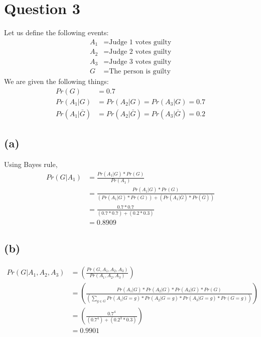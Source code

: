 \documentclass[11pt]{article}
\begin{document}
\section*{Question 3}
Let us define the following events:
\begin{equation*}
\begin{split}
A_1 &= \text{Judge 1 votes guilty}\\
A_2 &= \text{Judge 2 votes guilty}\\
A_3 &= \text{Judge 3 votes guilty}\\
G &= \text{The person is guilty}
\end{split}
\end{equation*}
We are given the following things:
\begin{equation*}
\begin{split}
Pr(G) &= 0.7\\
Pr(A_1|G) &= Pr(A_2|G) = Pr(A_3|G) = 0.7\\
Pr(A_1|\bar{G}) &= Pr(A_2|\bar{G}) = Pr(A_3|\bar{G}) = 0.2
\end{split}
\end{equation*}
\subsection*{(a)}
Using Bayes rule,
\begin{equation*}
\begin{split}
Pr(G|A_1) &= \frac{Pr(A_1|G)*Pr(G)}{Pr(A_1)}\\
&=\frac{Pr(A_1|G)*Pr(G)}{\left(Pr(A_1|G)*Pr(G)\right) + \left(Pr(A_1|\bar{G})*Pr(\bar{G})\right)}\\
&=\frac{0.7*0.7}{\left(0.7*0.7\right)+\left(0.2*0.3\right)}\\
&=0.8909
\end{split}
\end{equation*}
\subsection*{(b)}
\begin{equation*}
\begin{split}
Pr(G|A_1,A_2,A_3) &= \left(\frac{Pr(G,A_1,A_2,A_3)}{Pr(A_1,A_2,A_3)}\right)\\
&=\left(\frac{Pr(A_1|G)*Pr(A_2|G)*Pr(A_3|G)*Pr(G)}{(\sum_{g\in G}Pr(A_1|G=g)*Pr(A_2|G=g)*Pr(A_3|G=g)*Pr(G=g))}\right)\\
&=\left(\frac{0.7^4}{(0.7^4)+(0.2^3*0.3)}\right)\\
&=0.9901
\end{split}
\end{equation*}
\end{document}
